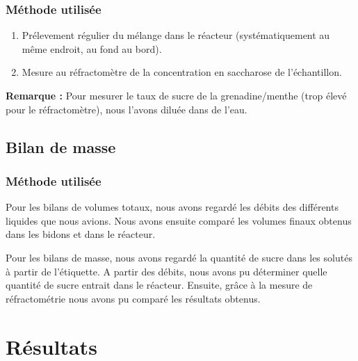\documentclass[a4paper,11pt]{article}
\begin{document}
		\subsubsection{Méthode utilisée}
			\begin{enumerate}
				\item Prélevement régulier du mélange dans le réacteur (systématiquement au même endroit, au fond au bord).
				\item Mesure au réfractomètre de la concentration en saccharose de l'échantillon.
			\end{enumerate}
			\textbf{Remarque :} Pour mesurer le taux de sucre de la grenadine/menthe (trop élevé pour le réfractomètre), nous l'avons diluée dans de l'eau.
	\subsection{Bilan de masse}
		\subsubsection{Méthode utilisée}
			Pour les bilans de volumes totaux, nous avons regardé les débits des différents liquides que nous avions. Nous avons ensuite comparé les volumes finaux obtenus dans les bidons et dans le réacteur.
			
			Pour les bilans de masse, nous avons regardé la quantité de sucre dans les solutés à partir de l'étiquette. A partir des débits, nous avons pu déterminer quelle quantité de sucre entrait dans le réacteur. Ensuite, grâce à la mesure de réfractométrie nous avons pu comparé les résultats obtenus.  

\section{Résultats}
\end{document}
